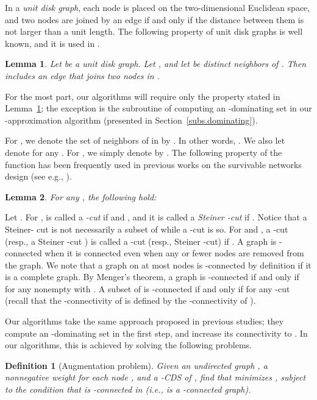 \documentclass[11pt]{article}
\newtheorem{lemma}{Lemma}
\newtheorem{definition}{Definition}
\begin{document}
 In a \emph{unit disk graph}, each node is placed on the two-dimensional
 Euclidean space,
 and two nodes are joined by an edge if and only if the distance between
 them is not larger than a unit length.
 The following property of unit disk graphs is well known,
 and it is used in \cite{Shang:2007jg}.

 \begin{lemma}\label{lem.kissingnum}
  Let  be a unit disk graph. Let ,
  and let  be distinct neighbors of .
  Then  includes an edge that joins two nodes in .
 \end{lemma}

 For the most part, our algorithms will require only the property stated
 in Lemma~\ref{lem.kissingnum}; the exception is the subroutine
 of computing an -dominating set
 in our -approximation algorithm
 (presented in Section~\ref{subs.dominating}).
 
For , we denote the set of neighbors of  in  by . In
other words, .
We also let  denote  for any .
For , we simply denote  by
.
The following property of the function 
has been frequently used in previous works on the survivable networks
design (see e.g., \cite{Nutov12}).


\begin{lemma}\label{lem.submodularity}
 For any ,
  the following hold:
 
 
\end{lemma}

 
Let .
For ,
 is called a
 \emph{-cut} if  and  , and it is called a
\emph{Steiner -cut} if
.
 Notice that a Steiner- cut is not necessarily a subset of 
 while a -cut is so.
For  and ,
 a -cut 
 (resp., a Steiner -cut )
 is called a -cut
 (resp., Steiner -cut)
 if .
A graph  is -connected
when it is connected even when any  or fewer nodes are removed from the graph.
We note that a graph on at most  nodes is -connected by definition if it is a complete graph.
By Menger's theorem, a graph  is -connected if and only if  for any nonempty  with .
A subset  of  is -connected if and only if 
for any -cut 
(recall that the -connectivity of  is defined by the
-connectivity of ).

Our algorithms take the same approach
proposed in
previous studies;
they compute an -dominating set in the first step, and
increase its connectivity to .
In our algorithms, this is achieved by solving
the following problems.

 \begin{definition}[Augmentation problem]
  \label{def.augmentation}
 Given an undirected graph , a nonnegative weight  for
 each node , and a -CDS
  of , find 
 that minimizes , 
 subject to the condition that  is -connected in  (i.e.,
   is a -connected graph).
 \end{definition}
\end{document}
